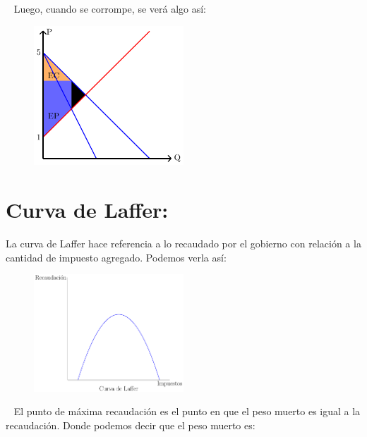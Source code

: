 \documentclass[
  letterpaper,
  DIV=11,
  numbers=noendperiod]{scrreport}
\begin{document}
~ Luego, cuando se corrompe, se verá algo así:

\begin{figure}

{\centering \includegraphics[width=0.5\textwidth,height=\textheight]{4sistimpo_files/figure-pdf/unnamed-chunk-2-1.pdf}

}

\end{figure}

\hypertarget{curva-de-laffer}{%
\section{Curva de Laffer:}\label{curva-de-laffer}}

La curva de Laffer hace referencia a lo recaudado por el gobierno con
relación a la cantidad de impuesto agregado. Podemos verla así:

\begin{figure}

{\centering \includegraphics[width=0.5\textwidth,height=\textheight]{4sistimpo_files/figure-pdf/unnamed-chunk-3-1.pdf}

}

\end{figure}

~ El punto de máxima recaudación es el punto en que el peso muerto es
igual a la recaudación. Donde podemos decir que el peso muerto es:
\end{document}
